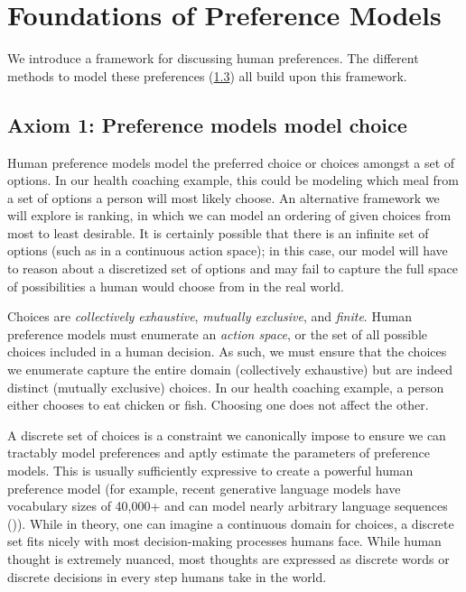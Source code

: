 \documentclass[
  letterpaper,
  DIV=11,
  numbers=noendperiod,
  oneside]{scrreprt}
\theoremstyle{remark}
\begin{document}
\section{Foundations of Preference Models}\label{sec:foundations}

We introduce a framework for discussing human preferences. The different
methods to model these preferences (\hyperref[sec:models]{1.3}) all
build upon this framework.

\subsection*{Axiom 1: Preference models model
choice}\label{axiom-1-preference-models-model-choice}

Human preference models model the preferred choice or choices amongst a
set of options. In our health coaching example, this could be modeling
which meal from a set of options a person will most likely choose. An
alternative framework we will explore is ranking, in which we can model
an ordering of given choices from most to least desirable. It is
certainly possible that there is an infinite set of options (such as in
a continuous action space); in this case, our model will have to reason
about a discretized set of options and may fail to capture the full
space of possibilities a human would choose from in the real world.

Choices are \emph{collectively exhaustive}, \emph{mutually exclusive},
and \emph{finite}. Human preference models must enumerate an
\emph{action space}, or the set of all possible choices included in a
human decision. As such, we must ensure that the choices we enumerate
capture the entire domain (collectively exhaustive) but are indeed
distinct (mutually exclusive) choices. In our health coaching example, a
person either chooses to eat chicken or fish. Choosing one does not
affect the other.

A discrete set of choices is a constraint we canonically impose to
ensure we can tractably model preferences and aptly estimate the
parameters of preference models. This is usually sufficiently expressive
to create a powerful human preference model (for example, recent
generative language models have vocabulary sizes of 40,000+ and can
model nearly arbitrary language sequences
()). While in theory,
one can imagine a continuous domain for choices, a discrete set fits
nicely with most decision-making processes humans face. While human
thought is extremely nuanced, most thoughts are expressed as discrete
words or discrete decisions in every step humans take in the world.
\end{document}
